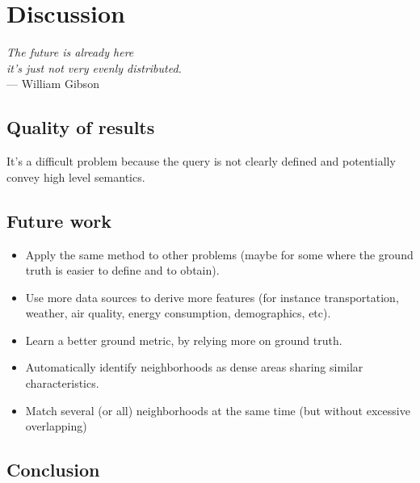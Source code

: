 \chapter{Discussion}
\label{chap:discussion}

\begin{flushright}{\slshape    
		The future is already here \\
		it's just not very evenly distributed.
    } \\ \medskip
    --- William Gibson
\end{flushright}

\section{Quality of results}

It's a difficult problem because the query is not clearly defined and
potentially convey high level semantics.

\section{Future work}
\begin{itemize}
	\item Apply the same method to other problems (maybe for some where the ground truth is easier to define and to obtain).
	\item Use more data sources to derive more features (for instance transportation, weather, air quality, energy consumption, demographics, etc).
	\item Learn a better ground metric, by relying more on ground truth.
	\item Automatically identify neighborhoods as dense areas sharing similar characteristics.
        \item Match several (or all) neighborhoods at the same time (but without excessive overlapping)
\end{itemize}
\section{Conclusion}
